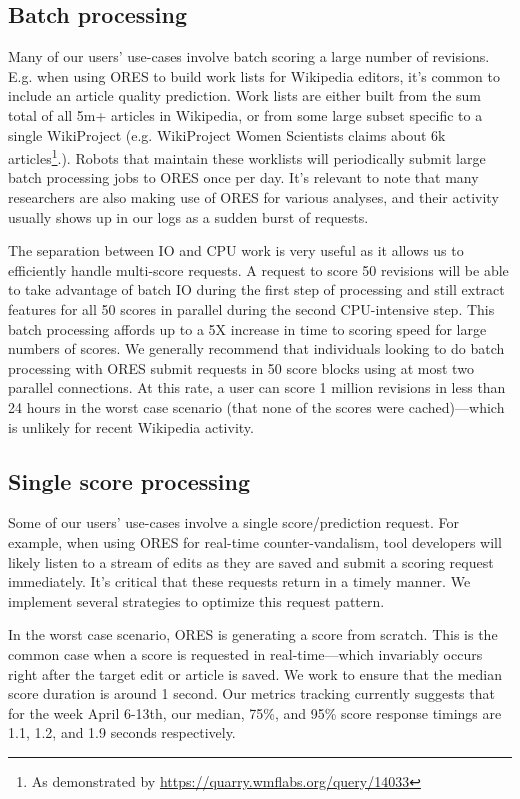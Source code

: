 \subsection{Batch processing}
Many of our users' use-cases involve batch scoring a large number of revisions.  E.g. when using ORES to build work lists for Wikipedia editors, it's common to include an article quality prediction.  Work lists are either built from the sum total of all 5m+ articles in Wikipedia, or from some large subset specific to a single WikiProject (e.g. WikiProject Women Scientists claims about 6k articles\footnote{As demonstrated by \url{https://quarry.wmflabs.org/query/14033}}.).  Robots that maintain these worklists will periodically submit large batch processing jobs to ORES once per day.  It's relevant to note that many researchers are also making use of ORES for various analyses, and their activity usually shows up in our logs as a sudden burst of requests.

The separation between IO and CPU work is very useful as it allows us to efficiently handle multi-score requests.  A request to score 50 revisions will be able to take advantage of batch IO during the first step of processing and still extract features for all 50 scores in parallel during the second CPU-intensive step.  This batch processing affords up to a 5X increase in time to scoring speed for large numbers of scores\cite{sarabadani2017building}.  We generally recommend that individuals looking to do batch processing with ORES submit requests in 50 score blocks using at most two parallel connections.  At this rate, a user can score 1 million revisions in less than 24 hours in the worst case scenario (that none of the scores were cached)---which is unlikely for recent Wikipedia activity.

\subsection{Single score processing}
Some of our users' use-cases involve a single score/prediction request.  For example, when using ORES for real-time counter-vandalism, tool developers will likely listen to a stream of edits as they are saved and submit a scoring request immediately.  It's critical that these requests return in a timely manner.  We implement several strategies to optimize this request pattern.

In the worst case scenario, ORES is generating a score from scratch.  This is the common case when a score is requested in real-time---which invariably occurs right after the target edit or article is saved.  We work to ensure that the median score duration is around 1 second.  Our metrics tracking currently suggests that for the week April 6-13th, our median, 75\%, and 95\% score response timings are 1.1, 1.2, and 1.9 seconds respectively.

